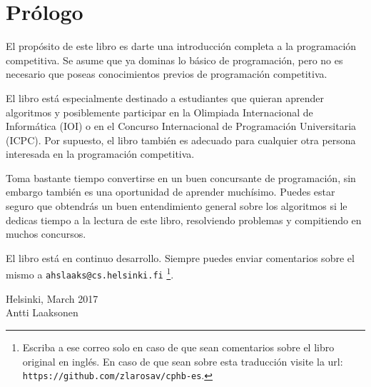 \chapter*{Prólogo}

El prop\'osito de este libro es darte
una introducci\'on completa a la programaci\'on competitiva.
Se asume que ya dominas lo b\'asico de programaci\'on, pero no
es necesario que poseas conocimientos previos de programaci\'on
competitiva.

El libro est\'a especialmente destinado a estudiantes que
quieran aprender algoritmos y posiblemente participar en
la Olimpiada Internacional de Inform\'atica (IOI) o en el
Concurso Internacional de Programaci\'on Universitaria (ICPC).
Por supuesto, el libro tambi\'en es adecuado para
cualquier otra persona interesada en la programaci\'on 
competitiva.

Toma bastante tiempo convertirse en un buen concursante de
programaci\'on, sin embargo tambi\'en es una oportunidad de
aprender much\'isimo. Puedes estar seguro que obtendr\'as un
buen entendimiento general sobre los algoritmos si le
dedicas tiempo a la lectura de este libro, resolviendo
problemas y compitiendo en muchos concursos.

El libro est\'a en continuo desarrollo. Siempre
puedes enviar comentarios sobre el mismo
a \texttt{ahslaaks@cs.helsinki.fi} \footnote{Escriba a ese
correo solo en caso de que sean comentarios sobre el
libro original en ingl\'es. En caso de que sean sobre esta
traducci\'on visite la url: \texttt{https://github.com/zlarosav/cphb-es}.}.

\begin{flushright}
Helsinki, March 2017 \\
Antti Laaksonen
\end{flushright}
